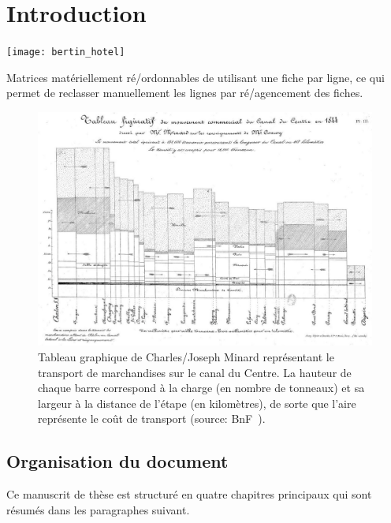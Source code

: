 
\chapter{Introduction}
\label{ch-1}

\lipsum[2-4]

\begin{marginfigure}
	\texttt{[image: bertin\_hotel]}
	\caption[Matrices ré\-/ordonnables de Jacques Bertin.]{Matrices matériellement ré\-/ordonnables de  \citet{bertin_la_1977} utilisant une fiche par ligne, ce qui permet de reclasser manuellement les lignes par ré\-/agencement des fiches.}	
	\label{fig-bertin-matrice}
\end{marginfigure}

\lipsum[3]


\begin{figure}[t]
	\centering
	\includegraphics[width=\linewidth]{figures/introduction/minard}
	\caption[Tableau graphique de Charles\-/Joseph Minard.]{Tableau graphique de Charles\-/Joseph Minard représentant le transport de marchandises sur le canal du Centre. La hauteur de chaque barre correspond à la charge (en nombre de tonneaux) et sa largeur à la distance de l'étape (en kilomètres), de sorte que l'aire représente le coût de transport (source: BnF~\citep{minard_des_1862}).}
	\label{fig-minard}
\end{figure}

\lipsum[2]

\section*{Organisation du document}
Ce manuscrit de thèse est structuré en quatre chapitres principaux qui sont résumés dans les paragraphes suivant. 

